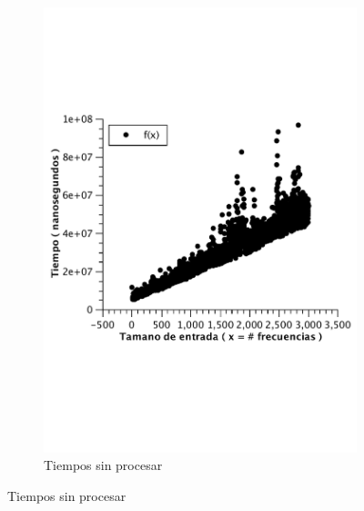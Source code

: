 \begin{figure}[H]
        \centering
        \begin{subfigure}[b]{0.5\textwidth}
                \includegraphics[width=\textwidth]{imagenes/af-wc-nlogn.pdf}
                \caption*{Tiempos sin procesar}
        \end{subfigure}%
\end{figure}

